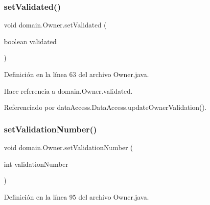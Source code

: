 \subsubsection{\texorpdfstring{setValidated()}{setValidated()}}
{\footnotesize\ttfamily void domain.\+Owner.\+set\+Validated (\begin{DoxyParamCaption}\item[{boolean}]{validated }\end{DoxyParamCaption})}



Definición en la línea 63 del archivo Owner.\+java.


\begin{DoxyCode}{0}

\end{DoxyCode}


Hace referencia a domain.\+Owner.\+validated.



Referenciado por data\+Access.\+Data\+Access.\+update\+Owner\+Validation().

\mbox{\label{classdomain_1_1_owner_aeaf0bcfe8dc2183aa6c2e99ded5530c6}} 
\subsubsection{\texorpdfstring{setValidationNumber()}{setValidationNumber()}}
{\footnotesize\ttfamily void domain.\+Owner.\+set\+Validation\+Number (\begin{DoxyParamCaption}\item[{int}]{validation\+Number }\end{DoxyParamCaption})}



Definición en la línea 95 del archivo Owner.\+java.


\begin{DoxyCode}{0}

\end{DoxyCode}


